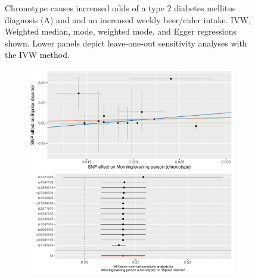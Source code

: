 \documentclass[journal,article,submit,moreauthors,pdftex]{Definitions/mdpi}
\begin{document}
\begin{figure}[htbp]
\begin{subfigure}[b]{0.4\textwidth}
         \caption{}
         \label{beer}
     \end{subfigure}
        \caption{Chronotype causes increased odds of a type 2 diabetes mellitus diagnosis (A) and and an increased weekly beer/cider intake. IVW, Weighted median, mode, weighted mode, and Egger regressions shown. Lower panels depict leave-one-out sensitivity analyses with the IVW method.}
        \label{t2dmalcohol}
\end{figure}

\begin{figure}[htbp]
     \centering
     \begin{subfigure}[b]{0.4\textwidth}
         \centering
         \includegraphics[width=\textwidth]{Figs/Analysis2/Morning_evening_person_(chronotype)_vs_Bipolar_disorder.Plots.pdf}
         \caption{}
         \label{t2dm}
     \end{subfigure}
     \begin{subfigure}[b]{0.4\textwidth}
         \centering

\end{subfigure}
\end{figure}
\end{document}
